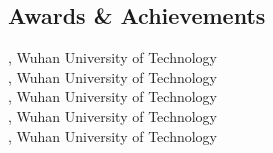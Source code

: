 \documentclass[mm]{simple_style}
\begin{document}
\begin{resume}
\section{Awards \& Achievements}
 , Wuhan University of Technology\\
 , Wuhan University of Technology\\
 , Wuhan University of Technology\\
 , Wuhan University of Technology\\
 , Wuhan University of Technology\\


\vspace{-2ex}
\sectionline


\end{resume}
\end{document}
